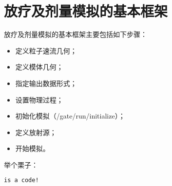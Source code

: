 \section{放疗及剂量模拟的基本框架}
放疗及剂量模拟的基本框架主要包括如下步骤：
\begin{itemize}
	\item 定义粒子速流几何；
	\item 定义模体几何；
	\item 指定输出数据形式；
	\item 设置物理过程；
	\item 初始化模拟（/gate/run/initialize）；
	\item 定义放射源；
	\item 开始模拟。
\end{itemize}

举个栗子：

\begin{lstlisting}
is a code!
\end{lstlisting}

